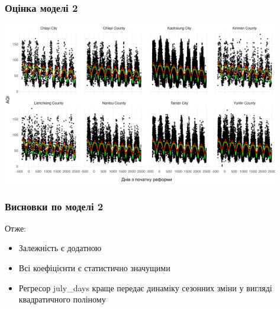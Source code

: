 \documentclass{beamer}
\begin{document}
\begin{frame}
  \frametitle{Оцінка моделі 2}
  
  \includegraphics[height=2.8in]{plots/lab3/model-2-plus-reform-and-season-vs-aqi.png}
\end{frame}

\begin{frame}
  \frametitle{Висновки по моделі 2}
  
  Отже:
  
  \begin{itemize}
    \item Залежність є додатною
    \item Всі коефіцієнти є статистично значущими
    \item Регресор july\_days краще передає динаміку сезонних зміни у вигляді квадратичного поліному
  \end{itemize}
\end{frame}
\end{document}
